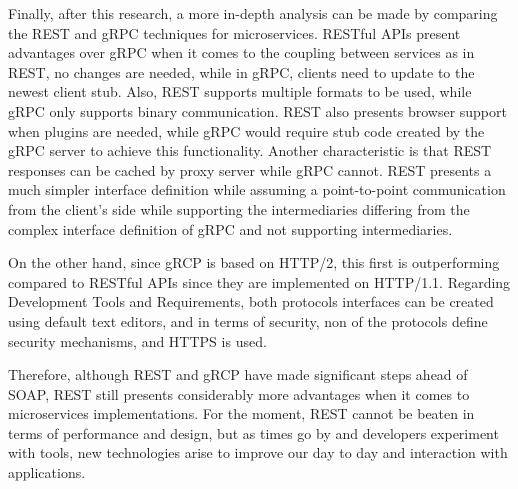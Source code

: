 \documentclass[conference]{IEEEtran}
\begin{document}
Finally, after this research, a more in-depth analysis can be made by comparing the REST and gRPC techniques for microservices. RESTful APIs present advantages over gRPC when it comes to the coupling between services as in REST, no changes are needed, while in gRPC, clients need to update to the newest client stub. Also, REST supports multiple formats to be used, while gRPC only supports binary communication. REST also presents browser support when plugins are needed, while gRPC would require stub code created by the gRPC server to achieve this functionality. Another characteristic is that REST responses can be cached by proxy server while gRPC cannot. REST presents a much simpler interface definition while assuming a point-to-point communication from the client's side while supporting the intermediaries differing from the complex interface definition of gRPC and not supporting intermediaries.

On the other hand, since gRCP is based on HTTP/2, this first is outperforming compared to RESTful APIs since they are implemented on HTTP/1.1. Regarding Development Tools and Requirements, both protocols interfaces can be created using default text editors, and in terms of security, non of the protocols define security mechanisms, and HTTPS is used.

Therefore, although REST and gRCP have made significant steps ahead of SOAP, REST still presents considerably more advantages when it comes to microservices implementations. For the moment, REST cannot be beaten in terms of performance and design, but as times go by and developers experiment with tools, new technologies arise to improve our day to day and interaction with applications.


\end{document}
